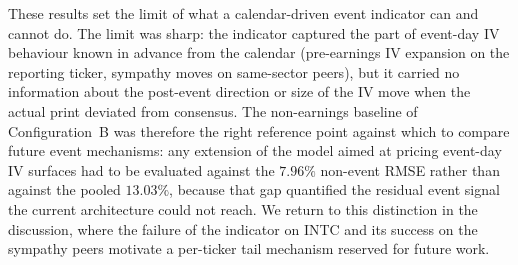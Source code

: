 These results set the limit of what a calendar-driven event indicator can and cannot do. The limit was sharp: the indicator captured the part of event-day IV behaviour known in advance from the calendar (pre-earnings IV expansion on the reporting ticker, sympathy moves on same-sector peers), but it carried no information about the post-event direction or size of the IV move when the actual print deviated from consensus. The non-earnings baseline of Configuration~B was therefore the right reference point against which to compare future event mechanisms: any extension of the model aimed at pricing event-day IV surfaces had to be evaluated against the $7.96\%$ non-event RMSE rather than against the pooled $13.03\%$, because that gap quantified the residual event signal the current architecture could not reach. We return to this distinction in the discussion, where the failure of the indicator on INTC and its success on the sympathy peers motivate a per-ticker tail mechanism reserved for future work.

